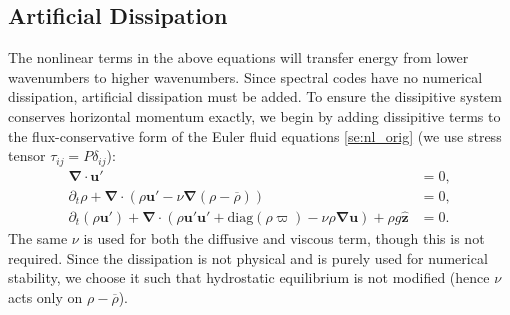\documentclass[
        fleqn,
        usenatbib,
    ]{mnras}
\newcommand*{\p}[1]{\left(#1\right)}
\newcommand*{\bm}[1]{\boldsymbol{\mathbf{#1}}}
\newcommand*{\uv}[1]{\hat{\boldsymbol{\mathbf{#1}}}}
\begin{document}
\subsection{Artificial Dissipation}

The nonlinear terms in the above equations will transfer energy from lower
wavenumbers to higher wavenumbers. Since spectral codes have no numerical
dissipation, artificial dissipation must be added. To ensure the dissipitive
system conserves horizontal momentum exactly, we begin by adding dissipitive
terms to the flux-conservative form of the Euler fluid equations
\autoref{se:nl_orig} (we use stress tensor $\tau_{ij} = P\delta_{ij}$):
\begin{subequations}
    \begin{align}
        \bm{\nabla} \cdot \bm{u}' &= 0,\\
        \partial_t \rho + \bm{\nabla} \cdot (\rho \bm{u}' - \nu
            \bm{\nabla}(\rho - \overline{\rho})) &= 0,\label{eq:visc_cons_mom}\\
        \partial_t (\rho \bm{u}') + \bm{\nabla} \cdot (\rho \bm{u}' \bm{u}'
            + \mathrm{diag}(\rho \varpi)
            - \nu \rho \bm{\nabla}\bm{u})
            + \rho g \uv{z} &= 0.
    \end{align}
\end{subequations}
The same $\nu$ is used for both the diffusive and viscous term, though this is
not required. Since the dissipation is not physical and is purely used for
numerical stability, we choose it such that hydrostatic equilibrium is not
modified (hence $\nu$ acts only on $\rho - \overline{\rho}$).
\end{document}
